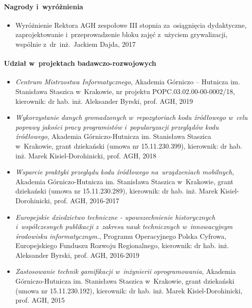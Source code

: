 \documentclass[twoside]{praca}
\begin{document}
\paragraph{Nagrody i~wyróżnienia}
\begin{itemize}
\item Wyróżnienie Rektora AGH zespołowe III stopnia za~osiągnięcia dydaktyczne, zaprojektowanie i~przeprowadzenie bloku zajęć z~użyciem grywalizacji, wspólnie z~dr~inż.~Jackiem Dajda, 2017
\end{itemize}

\paragraph{Udział w~projektach badawczo-rozwojowych}
\begin{itemize}
\item \textit{Centrum Mistrzostwa Informatycznego}, Akademia Górniczo – Hutnicza im. Stanisława Staszica w~Krakowie, nr projektu POPC.03.02.00-00-0002/18, kierownik: dr hab. inż. Aleksander Byrski, prof. AGH, 2019

\item \textit{Wykorzystanie danych gromadzonych w~repozytoriach kodu źródłowego w~celu poprawy jakości pracy programistów i~popularyzacji przeglądów kodu źródłowego}, Akademia Górniczo-Hutnicza im. Stanisława Staszica w~Krakowie, grant dziekański (umowa nr 15.11.230.399), kierownik: dr hab. inż. Marek Kisiel-Do\-ro\-hi\-ni\-cki, prof. AGH, 2018

\item \textit{Wsparcie praktyki przeglądu kodu źródłowego na~urządzeniach mobilnych}, Akademia Górniczo-Hutnicza im. Stanisława Staszica w~Krakowie, grant dziekański (umowa nr 15.11.230.289), kierownik: dr hab. inż. Marek Kisiel-Dorohinicki, prof. AGH, 2016-2017

\item \textit{Europejskie dziedzictwo techniczne - upowszechnienie historycznych i~współczesnych publikacji z~zakresu nauk technicznych w~innowacyjnym środowisku informatycznym.}, Programu Operacyjnego Polska Cyfrowa, Europejskiego Funduszu Rozwoju Regionalnego, kierownik: dr hab. inż. Aleksander Byrski, prof. AGH, 2016-2019

\item \textit{Zastosowanie technik gamifikacji w~inżynierii oprogramowania}, Akademia Gó\-rni\-czo-Hutnicza im. Stanisława Staszica w~Krakowie, grant dziekański (umowa nr 15.11.230.192), kierownik: dr hab. inż. Marek Kisiel-Dorohinicki, prof. AGH, 2015


\end{itemize}
\end{document}
